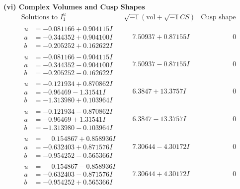 \documentclass[1p]{elsarticle_modified}
\theoremstyle{definition}
\newcommand{\I}{\sqrt{-1}}
\begin{document}
\newpage\flushleft \textbf{(vi) Complex Volumes and Cusp Shapes}
$$\begin{array}{c|c|c}  
\text{Solutions to }I^u_{1}& \I (\text{vol} + \sqrt{-1}CS) & \text{Cusp shape}\\
 \hline 
\begin{aligned}
u &= -0.081166 + 0.904115 I \\
a &= -0.344352 + 0.904100 I \\
b &= -0.205252 + 0.162622 I\end{aligned}
 & \phantom{-}7.50937 + 0.87155 I & \phantom{-0.000000 } 0 \\ \hline\begin{aligned}
u &= -0.081166 - 0.904115 I \\
a &= -0.344352 - 0.904100 I \\
b &= -0.205252 - 0.162622 I\end{aligned}
 & \phantom{-}7.50937 - 0.87155 I & \phantom{-0.000000 } 0 \\ \hline\begin{aligned}
u &= -0.121934 + 0.870862 I \\
a &= -0.96469 - 1.31541 I \\
b &= -1.313980 + 0.103964 I\end{aligned}
 & \phantom{-}6.3847 + 13.3757 I & \phantom{-0.000000 } 0 \\ \hline\begin{aligned}
u &= -0.121934 - 0.870862 I \\
a &= -0.96469 + 1.31541 I \\
b &= -1.313980 - 0.103964 I\end{aligned}
 & \phantom{-}6.3847 - 13.3757 I & \phantom{-0.000000 } 0 \\ \hline\begin{aligned}
u &= \phantom{-}0.154867 + 0.858936 I \\
a &= -0.632403 + 0.871576 I \\
b &= -0.954252 - 0.565366 I\end{aligned}
 & \phantom{-}7.30644 - 4.30172 I & \phantom{-0.000000 } 0 \\ \hline\begin{aligned}
u &= \phantom{-}0.154867 - 0.858936 I \\
a &= -0.632403 - 0.871576 I \\
b &= -0.954252 + 0.565366 I\end{aligned}
 & \phantom{-}7.30644 + 4.30172 I & \phantom{-0.000000 } 0 \\ \hline\begin{aligned}

\end{aligned}
\end{array}$$
\end{document}
